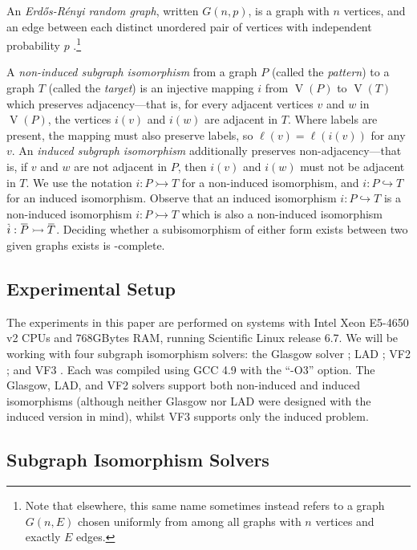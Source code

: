 \documentclass[twoside,11pt]{article}
\newcommand{\shortoverline}[1]{\mkern 1.5mu\overline{\mkern-1.5mu#1\mkern-1.5mu}\mkern 1.5mu}
\begin{document}
An \emph{Erd\H{o}s-R\'enyi random graph}, written $G(n, p)$, is a graph with $n$ vertices, and an
edge between each distinct unordered pair of vertices with independent probability $p$
\cite{o:Gilbert59,o:ErdosR59}.\footnote{Note that elsewhere, this same name sometimes instead
refers to a graph $G(n, E)$ chosen uniformly from among all graphs with $n$ vertices and exactly $E$
edges.}

A \emph{non-induced subgraph isomorphism} from a graph $P$ (called the \emph{pattern}) to a graph
$T$ (called the \emph{target}) is an injective mapping $i$ from $\operatorname{V}(P)$ to
$\operatorname{V}(T)$ which preserves adjacency---that is, for every adjacent vertices $v$ and $w$ in
$\operatorname{V}(P)$, the vertices $i(v)$ and $i(w)$ are adjacent in $T$. Where labels are present,
the mapping must also preserve labels, so $\ell(v) = \ell(i(v))$ for any $v$. An \emph{induced
subgraph isomorphism} additionally preserves non-adjacency---that is, if $v$ and $w$ are not
adjacent in $P$, then $i(v)$ and $i(w)$ must not be adjacent in $T$. We use the notation $i : P
\rightarrowtail T$ for a non-induced isomorphism, and $i : P \hookrightarrow T$ for an induced
isomorphism. Observe that an induced isomorphism $i : P \hookrightarrow T$ is a non-induced
isomorphism $i : P \rightarrowtail T$ which is also a non-induced isomorphism $\shortoverline{i} :
\shortoverline{P} \rightarrowtail \shortoverline{T}$. Deciding whether a subisomorphism of either
form exists between two given graphs exists is \NP-complete.

\subsection{Experimental Setup}

The experiments in this paper are performed on systems with Intel Xeon E5-4650 v2 CPUs and 768GBytes
RAM, running Scientific Linux release 6.7. We will be working with four subgraph isomorphism
solvers: the Glasgow solver \cite{DBLP:conf/cp/McCreeshP15,DBLP:conf/lion/KotthoffMS16}; LAD
\cite{DBLP:journals/ai/Solnon10}; VF2 \cite{DBLP:journals/pami/CordellaFSV04}; and VF3
\cite{DBLP:conf/gbrpr/CarlettiFSV17}. Each was compiled using GCC 4.9 with the ``-O3'' option.
The Glasgow, LAD, and VF2 solvers support both non-induced and induced isomorphisms (although
neither Glasgow nor LAD were designed with the induced version in mind), whilst VF3 supports only
the induced problem.

\subsection{Subgraph Isomorphism Solvers}
\end{document}
